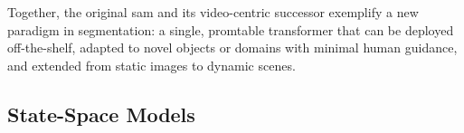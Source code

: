 Together, the original \acrshort{sam} and its video-centric successor exemplify a new paradigm in segmentation: a single, promtable transformer that can be deployed off-the-shelf, adapted to novel objects or domains with minimal human guidance, and extended from static images to dynamic scenes. 

\subsection{State-Space Models}
\label{ssec:state_space_models}

